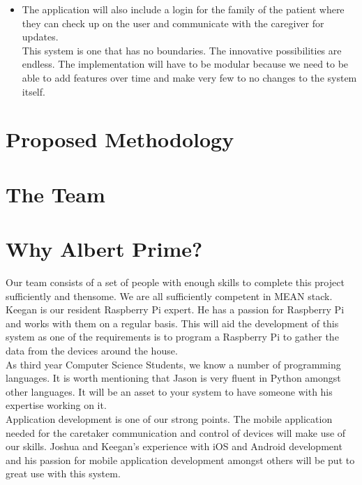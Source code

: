 \documentclass{article}
\begin{document}
\begin{itemize}
		\item The application will also include a login for the family of the patient where they can check up on the user and communicate with the caregiver for updates.  \\
		
		This system is one that has no boundaries. The innovative possibilities are endless. The implementation will have to be modular because we need to be able to add features over time and make very few to no changes to the system itself.
		
	\end{itemize}

	\newpage
	\section{Proposed Methodology}
	
	\newpage
	\section{The Team}
	
	\newpage
	\section{Why Albert Prime?}
	
	Our team consists of a set of people with enough skills to complete this project sufficiently and thensome. We are all sufficiently competent in MEAN stack. \\ 
	
	Keegan is our resident Raspberry Pi expert. He has a passion for Raspberry Pi and works with them on a regular basis. This will aid the development of this system as one of the requirements is to program a Raspberry Pi to gather the data from the devices around the house.\\
	
	As third year Computer Science Students, we know a number of programming languages. It is worth mentioning that Jason is very fluent in Python amongst other languages. It will be an asset to your system to have someone with his expertise working on it.\\
	
	
	Application development is one of our strong points. The mobile application needed for the caretaker communication and control of devices will make use of our skills. Joshua and Keegan's experience with iOS and Android development and his passion for mobile application development amongst others will be put to great use with this system.\\
	
\end{document}
